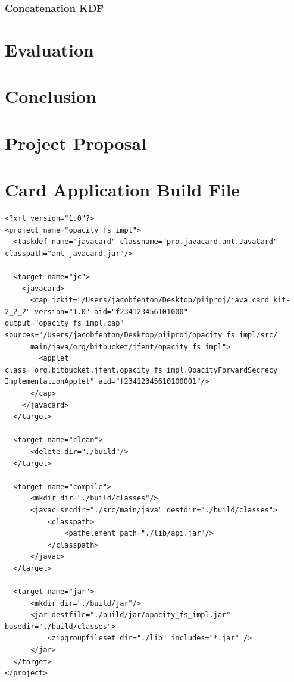 \documentclass[12pt,a4paper,twoside,openright]{report}
\begin{document}
\blindtext

\subsection{Concatenation KDF}

\blindtext

\chapter{Evaluation}



\chapter{Conclusion}




\appendix

\chapter{Project Proposal}
\label{appendix:proposal}



\chapter{Card Application Build File}
\label{appendix:cardappbuildfile}

\begin{verbatim}
<?xml version="1.0"?>
<project name="opacity_fs_impl">
  <taskdef name="javacard" classname="pro.javacard.ant.JavaCard" classpath="ant-javacard.jar"/>

  <target name="jc">
    <javacard>
      <cap jckit="/Users/jacobfenton/Desktop/piiproj/java_card_kit-2_2_2" version="1.0" aid="f234123456101000" output="opacity_fs_impl.cap" sources="/Users/jacobfenton/Desktop/piiproj/opacity_fs_impl/src/
      main/java/org/bitbucket/jfent/opacity_fs_impl">
        <applet class="org.bitbucket.jfent.opacity_fs_impl.OpacityForwardSecrecy ImplementationApplet" aid="f23412345610100001"/>
      </cap>
    </javacard>
  </target>

  <target name="clean">
      <delete dir="./build"/>
  </target>

  <target name="compile">
      <mkdir dir="./build/classes"/>
      <javac srcdir="./src/main/java" destdir="./build/classes">
          <classpath>
              <pathelement path="./lib/api.jar"/>
          </classpath>
      </javac>
  </target>

  <target name="jar">
      <mkdir dir="./build/jar"/>
      <jar destfile="./build/jar/opacity_fs_impl.jar" basedir="./build/classes">
          <zipgroupfileset dir="./lib" includes="*.jar" />
      </jar>
  </target>
</project>
\end{verbatim}
\end{document}
